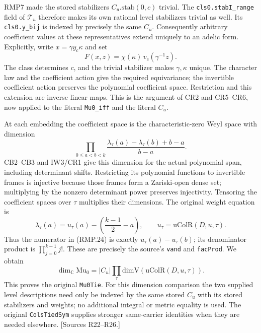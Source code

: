RMP7 made the stored stabilizers $C_u.\mathrm{stab}(0,c)$ trivial.
The \texttt{cls0.stabI\_range} field of $\mathcal T_u$ therefore
makes its own rational level stabilizers trivial as well. Its
\texttt{cls0.y\_bij} is indexed by precisely the same $C_u$.
Consequently arbitrary coefficient values at these representatives
extend uniquely to an adelic form. Explicitly, write
$x=\gamma y_c\kappa$ and set
\[
       F(x,z)=\chi(\kappa)\,v_c(\gamma^{-1}z).
                                                               \tag{RMP.23}
\]
The class determines $c$, and the trivial stabilizer makes
$\gamma,\kappa$ unique. The character law and the coefficient
action give the required equivariance; the invertible coefficient
action preserves the polynomial coefficient space. Restriction
and this extension are inverse linear maps. This is the argument
of CR2 and CR5--CR6, now applied to the literal \texttt{Mu0\_iff}
and the literal $C_u$.

At each embedding the coefficient space is the characteristic-zero
Weyl space with dimension
\[
 \prod_{0\le a<b<k}
         \frac{\lambda_\tau(a)-\lambda_\tau(b)+b-a}{b-a}.
                                                               \tag{RMP.24}
\]
CB2--CB3 and IW3/CR1 give this dimension for the actual polynomial
span, including determinant shifts. Restricting its polynomial
functions to invertible frames is injective because those frames
form a Zariski-open dense set; multiplying by the nonzero determinant
power preserves injectivity. Tensoring the coefficient spaces over
$\tau$ multiplies their dimensions.
The original weight equation is
\[
 \lambda_\tau(a)=u_\tau(a)-\left(\frac{k-1}{2}-a\right),
       \qquad u_\tau=\mathrm{uColR}(D,u,\tau).
                                                               \tag{RMP.25}
\]
Thus the numerator in (RMP.24) is exactly $u_\tau(a)-u_\tau(b)$;
its denominator product is $\prod_{j=0}^{k-1}j!$.
These are precisely the source's \texttt{vand} and
\texttt{facProd}. We obtain
\[
 \boxed{\dim_{\mathbb C}\mathrm{Mu}_0
            =|C_u|\prod_\tau\mathrm{dimV}(\mathrm{uColR}(D,u,\tau)).}
                                                               \tag{RMP.26}
\]
This proves the original \texttt{Mu0Tie}. For this dimension
comparison the two supplied level descriptions need only be
indexed by the same stored $C_u$ with its stored stabilizers and
weights; no additional integral or metric equality is used.
The original \texttt{ColsTiedSym} supplies stronger same-carrier
identities when they are needed elsewhere. [Sources R22--R26.]

